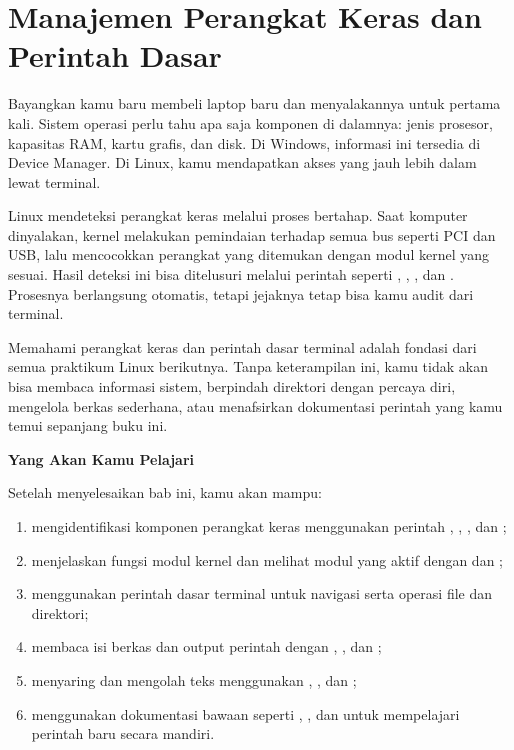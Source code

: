 
\chapter{Manajemen Perangkat Keras dan Perintah Dasar}
\label{ch:hardware-and-basic-commands}

Bayangkan kamu baru membeli laptop baru dan menyalakannya untuk pertama kali. Sistem operasi perlu tahu apa saja komponen di dalamnya: jenis prosesor, kapasitas RAM, kartu grafis, dan disk. Di Windows, informasi ini tersedia di Device Manager. Di Linux, kamu mendapatkan akses yang jauh lebih dalam lewat terminal.

Linux mendeteksi perangkat keras melalui proses bertahap. Saat komputer dinyalakan, kernel melakukan pemindaian terhadap semua bus seperti PCI dan USB, lalu mencocokkan perangkat yang ditemukan dengan modul kernel yang sesuai. Hasil deteksi ini bisa ditelusuri melalui perintah seperti , , , dan . Prosesnya berlangsung otomatis, tetapi jejaknya tetap bisa kamu audit dari terminal.

Memahami perangkat keras dan perintah dasar terminal adalah fondasi dari semua praktikum Linux berikutnya. Tanpa keterampilan ini, kamu tidak akan bisa membaca informasi sistem, berpindah direktori dengan percaya diri, mengelola berkas sederhana, atau menafsirkan dokumentasi perintah yang kamu temui sepanjang buku ini.

\textbf{Yang Akan Kamu Pelajari}

Setelah menyelesaikan bab ini, kamu akan mampu:

\begin{enumerate}
    \item mengidentifikasi komponen perangkat keras menggunakan perintah , , , dan ;
    \item menjelaskan fungsi modul kernel dan melihat modul yang aktif dengan  dan ;
    \item menggunakan perintah dasar terminal untuk navigasi serta operasi file dan direktori;
    \item membaca isi berkas dan output perintah dengan , , dan ;
    \item menyaring dan mengolah teks menggunakan , , dan ;
    \item menggunakan dokumentasi bawaan seperti , , dan  untuk mempelajari perintah baru secara mandiri.
\end{enumerate}


